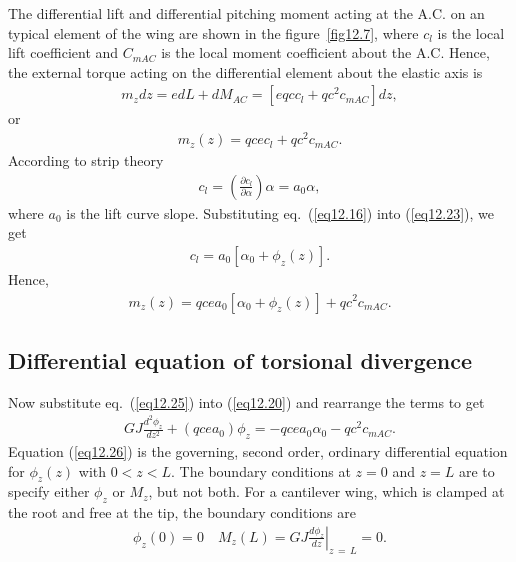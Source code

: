 \documentclass{AeroStructure-ERJohnson}
\begin{document}
The differential lift and differential pitching moment acting at the A.C. on an typical element of the wing are shown in the figure~\ref{fig12.7}, where $c_{l}$ is the local lift coefficient and $C_{mAC}$ is the local moment coefficient about the A.C. Hence, the external torque acting on the differential element about the elastic axis is
\begin{align}\label{eq12.21}
m_{z} d z=e d L+d M_{A C}=\left[e q c c_{l}+q c^{2} c_{m A C}\right] d z,
\end{align}
or
\begin{align}\label{eq12.22}
m_{z}(z)=q c e c_{l}+q c^{2} c_{m A C}.
\end{align}
According to strip theory
\begin{align}\label{eq12.23}
c_{l}=\left(\frac{\partial c_{l}}{\partial \alpha}\right) \alpha=a_{0} \alpha,
\end{align}
where $a_{0}$ is the lift curve slope. Substituting eq.~(\ref{eq12.16}) into (\ref{eq12.23}), we get
\begin{align}\label{eq12.24}
c_{l}=a_{0}\left[\alpha_{0}+\phi_{z}(z)\right].
\end{align}
Hence,
\begin{align}\label{eq12.25}
m_{z}(z)=q c e a_{0}\left[\alpha_{0}+\phi_{z}(z)\right]+q c^{2} c_{m A C}.
\end{align}

\subsection{Differential equation of torsional divergence}\label{sec12.3.2}

Now substitute eq.~(\ref{eq12.25}) into (\ref{eq12.20}) and rearrange the terms to get
\begin{align}\label{eq12.26}
G J \frac{d^{2} \phi_{z}}{d z^{2}}+\left(q c e a_{0}\right) \phi_{z}=-q c e a_{0} \alpha_{0}-q c^{2} c_{m A C}.
\end{align}
Equation (\ref{eq12.26}) is the governing, second order, ordinary differential equation for $\phi_{z}(z)$ with $0<z<L$. The boundary conditions at $z=0$ and $z=L$ are to specify either $\phi_{z}$ or $M_{z}$, but not both. For a cantilever wing, which is clamped at the root and free at the tip, the boundary conditions are
\begin{align}\label{eq12.27}
\phi_{z}(0)=0 \quad M_{z}(L)=\left.G J \frac{d \phi_{z}}{d z}\right|_{z\,{=}\,L}=0.
\end{align}
\end{document}
